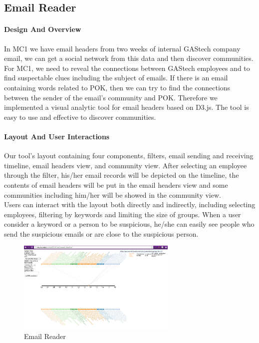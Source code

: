 \documentclass{vgtc}                          %
\begin{document}
\subsection{Email Reader}
\paragraph{Design And Overview}
In MC1 we have email headers from two weeks of internal GAStech company email, we can get a social network from this data and then discover communities. For MC1, we need to reveal the connections between GAStech employees and to find suspectable clues including the subject of emails. If there is an email containing words related to POK, then we can try to find the connections between the sender of the email's community and POK. Therefore we implemented a visual analytic tool for email headers based on D3.js. The tool is easy to use and effective to discover communities. 

\paragraph{Layout And User Interactions}
Our tool's layout containing four components, filters, email sending and receiving timeline, email headers view, and community view.
After selecting an employee through the filter, his/her email records will be depicted on the timeline, the contents of email headers will be put in the email headers view and some communities including him/her will be showed in the community view.  \\
Users can interact with the layout both directly and indirectly, including selecting employees, filtering by keywords and limiting the size of groups. When a user consider a keyword or a person to be suspicious, he/she can easily see people who send the suspicious emails or are close to the suspicious person.
\begin{figure}[htb]
  \centering
  \includegraphics[width=3in]{image_et.png}
  \caption{Email Reader}
\end{figure}
\end{document}
